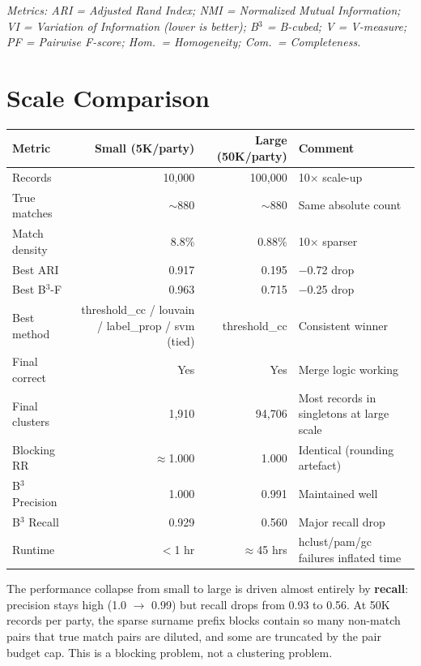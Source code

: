 \documentclass[11pt, a4paper]{article}
\begin{document}
\textit{Metrics: ARI = Adjusted Rand Index; NMI = Normalized Mutual Information;
VI = Variation of Information (lower is better); B$^3$ = B-cubed; V = V-measure;
PF = Pairwise F-score; Hom.\ = Homogeneity; Com.\ = Completeness.}

\section{Scale Comparison}

\begin{table}[h!]
\centering
\begin{tabular}{lrrl}
\toprule
\textbf{Metric} & \textbf{Small (5K/party)} & \textbf{Large (50K/party)} & \textbf{Comment} \\
\midrule
Records            & 10,000    & 100,000    & 10$\times$ scale-up \\
True matches       & $\sim$880 & $\sim$880  & Same absolute count \\
Match density      & 8.8\%     & 0.88\%     & 10$\times$ sparser \\
Best ARI           & 0.917     & 0.195      & $-$0.72 drop \\
Best B$^3$-F       & 0.963     & 0.715      & $-$0.25 drop \\
Best method        & threshold\_cc / louvain / label\_prop / svm (tied) & threshold\_cc & Consistent winner \\
Final correct      & Yes       & Yes        & Merge logic working \\
Final clusters     & 1,910     & 94,706     & Most records in singletons at large scale \\
Blocking RR        & $\approx$1.000 & 1.000 & Identical (rounding artefact) \\
B$^3$ Precision    & 1.000     & 0.991      & Maintained well \\
B$^3$ Recall       & 0.929     & 0.560      & Major recall drop \\
Runtime            & $<$1 hr   & $\approx$45 hrs & hclust/pam/gc failures inflated time \\
\bottomrule
\end{tabular}
\end{table}

The performance collapse from small to large is driven almost entirely by
\textbf{recall}: precision stays high (1.0 $\to$ 0.99) but recall drops from
0.93 to 0.56. At 50K records per party, the sparse surname prefix blocks contain
so many non-match pairs that true match pairs are diluted, and some are
truncated by the pair budget cap. This is a blocking problem, not a clustering
problem.
\end{document}
